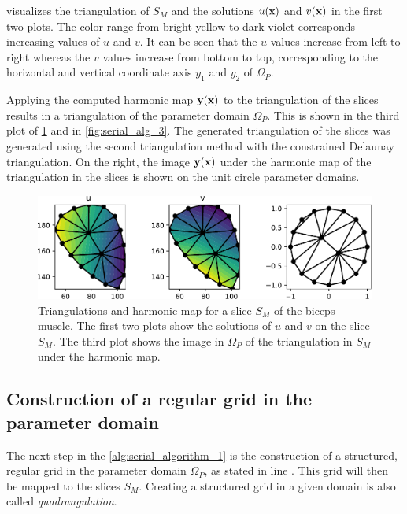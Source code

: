  visualizes the triangulation of $S_M$ and the solutions $u(\textbf{x})$ and $v(\textbf{x})$ in the first two plots. The color range from bright yellow to dark violet corresponds increasing values of $u$ and $v$. It can be seen that the $u$ values increase from left to right whereas the $v$ values increase from bottom to top, corresponding to the horizontal and vertical coordinate axis $y_1$ and $y_2$ of $\Omega_P$.


Applying the computed harmonic map $\textbf{y}(\textbf{x})$ to the triangulation of the slices results in a triangulation of the parameter domain $\Omega_P$. This is shown in the third plot of \cref{fig:harmonic_map_solution} and in \cref{fig:serial_alg_3}.
The generated triangulation of the slices was generated using the second triangulation method with the constrained Delaunay triangulation. On the right, the image $\textbf{y}(\textbf{x})$ under the harmonic map of the triangulation in the slices is shown on the unit circle parameter domains.

\begin{figure}%
  \centering%
  \includegraphics[width=\textwidth]{images/fiber_creation/harmonic_map_9b.pdf}%
  \caption{Triangulations and harmonic map for a slice $S_M$ of the biceps muscle. The first two plots show the solutions of $u$ and $v$ on the slice $S_M$. The third plot shows the image in $\Omega_P$ of the triangulation in $S_M$ under the harmonic map.}%
  \label{fig:harmonic_map_solution}%
\end{figure}%

\subsection{Construction of a regular grid in the parameter domain}
The next step in the \cref{alg:serial_algorithm_1} is the construction of a structured, regular grid in the parameter domain $\Omega_P$, as stated in line . This grid will then be mapped to the slices $S_M$. Creating a structured grid in a given domain is also called \emph{quadrangulation}.

